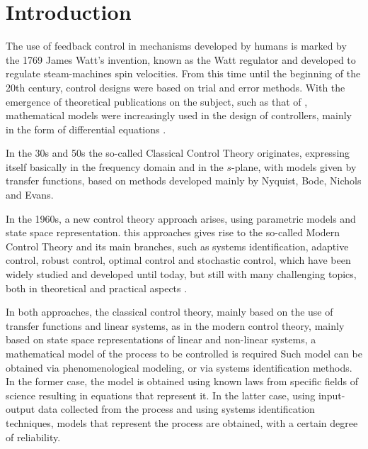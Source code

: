 
\chapter{Introduction}
\label{cap1} \vspace{-1cm}

%
The use of feedback control in mechanisms developed by humans is marked by the 1769 James Watt's invention, known as the Watt regulator and developed to regulate steam-machines spin velocities.
From this time until the beginning of the 20th century, control designs were based on trial and error methods. With the emergence of theoretical publications on the subject, such as that of \citep{tolle1921}, mathematical models were increasingly used in the design of controllers, mainly in the form of differential equations \citep{takahashi1972}.

In the 30s and 50s the so-called Classical Control Theory originates, expressing itself basically in the frequency domain and in the $s$-plane, with models given by transfer functions, based on methods developed mainly by Nyquist, Bode, Nichols and Evans.

In the 1960s, a new control theory approach arises, using parametric models and state space representation. this approaches gives rise to the so-called Modern Control Theory and its main branches, such as systems identification, adaptive control, robust control, optimal control and stochastic control, which have been widely studied and developed until today, but still with many challenging topics, both in theoretical and practical aspects \citep{hou2013}.

In both approaches, the classical control theory, mainly based on the use of transfer functions and linear systems, as in the modern control theory, mainly based on state space representations of linear and non-linear systems, a mathematical model of the process to be controlled is required
Such model can be obtained via phenomenological modeling, or via systems identification methods. In the former case, the model is obtained using known laws from specific fields of science resulting in equations that represent it. In the latter case, using input-output data collected from the process and using systems identification techniques, models that represent the process are obtained, with a certain degree of reliability.

